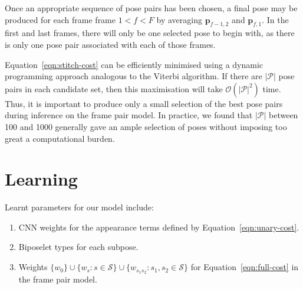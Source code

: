 \documentclass[runningheads]{llncs}
\newcommand{\mat}{\mathbf}
\begin{document}
Once an appropriate sequence of pose pairs has been chosen, a final pose may be
produced for each frame frame $1 < f < F$ by averaging $\mat p_{f-1,2}$ and
$\mat p_{f,1}$. In the first and last frames, there will only be one selected
pose to begin with, as there is only one pose pair associated with each of those
frames.

Equation~\ref{eqn:stitch-cost} can be efficiently minimised using a dynamic
programming approach analogous to the Viterbi algorithm. If there are $|\mathcal
P|$ pose pairs in each candidate set, then this maximisation will take $\mathcal
O(|\mathcal P|^2)$ time. Thus, it is important to produce only a small selection
of the best pose pairs during inference on the frame pair model. In practice, we
found that $|\mathcal P|$ between 100 and 1000 generally gave an ample selection
of poses without imposing too great a computational burden.

\section{Learning}

Learnt parameters for our model include:
%
\begin{enumerate}
\item CNN weights for the appearance terms defined by
Equation~\ref{eqn:unary-cost}.
\item Biposelet types for each subpose.
\item Weights $\{w_0\} \cup \{w_s : s \in \mathcal S\} \cup\{w_{s_1 s_2} : s_1,
s_2 \in \mathcal S\}$ for Equation~\ref{eqn:full-cost} in the frame pair model.
\end{enumerate}



\cite{ramanan2013dual}

\end{document}
